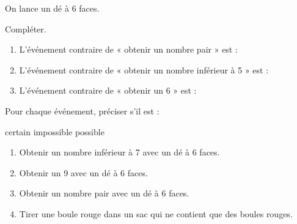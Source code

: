 \documentclass[11pt]{article}
\begin{document}
\begin{exercice}

On lance un dé à 6 faces.

Compléter.

\begin{enumerate}
    \item L'événement contraire de « obtenir un nombre pair » est :
    \dotfill

    \item L'événement contraire de « obtenir un nombre inférieur à 5 » est :
    \dotfill

    \item L'événement contraire de « obtenir un 6 » est :
    \dotfill
\end{enumerate}

\end{exercice}


\begin{exercice}

Pour chaque événement, préciser s'il est :

\begin{center}
certain \hspace{1cm} impossible \hspace{1cm} possible
\end{center}

\begin{enumerate}
    \item Obtenir un nombre inférieur à 7 avec un dé à 6 faces.
    \item Obtenir un 9 avec un dé à 6 faces.
    \item Obtenir un nombre pair avec un dé à 6 faces.
    \item Tirer une boule rouge dans un sac qui ne contient que des boules rouges.
\end{enumerate}

\end{exercice}
\end{document}
